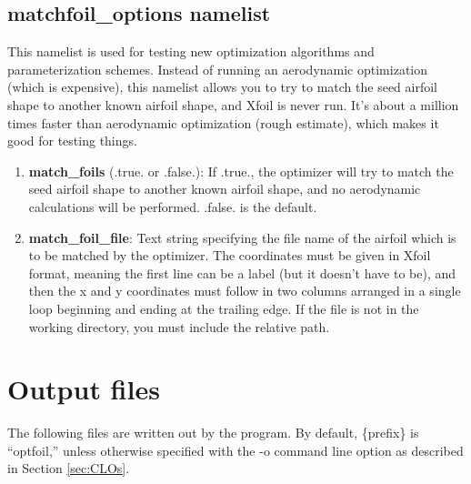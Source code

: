 \documentclass[11pt]{article}
\begin{document}
\subsection{matchfoil\_options namelist}

This namelist is used for testing new optimization algorithms and parameterization
schemes.  Instead of running an aerodynamic optimization (which is expensive), this
namelist allows you to try to match the seed airfoil shape to another known airfoil shape,
and Xfoil is never run.  It's about a million times faster than aerodynamic optimization
(rough estimate), which makes it good for testing things.

\begin{enumerate}
\item{\textbf{match\_foils} (.true. or .false.): If .true., the optimizer will try to
match the seed airfoil shape to another known airfoil shape, and no aerodynamic
calculations will be performed.  .false. is the default.}
\item{\textbf{match\_foil\_file}: Text string specifying the file name of the airfoil
which is to be matched by the optimizer.  The coordinates must be given in Xfoil format,
meaning the first line can be a label (but it doesn't have to be), and then the x and y
coordinates must follow in two columns arranged in a single loop beginning and ending at
the trailing edge. If the file is not in the working directory, you must include the
relative path.}
\end{enumerate}

\section{Output files}\label{sec:output_files}

The following files are written out by the program. By default, \{prefix\} is ``optfoil,''
unless otherwise specified with the -o command line option as described in Section
\ref{sec:CLOs}.
\end{document}
